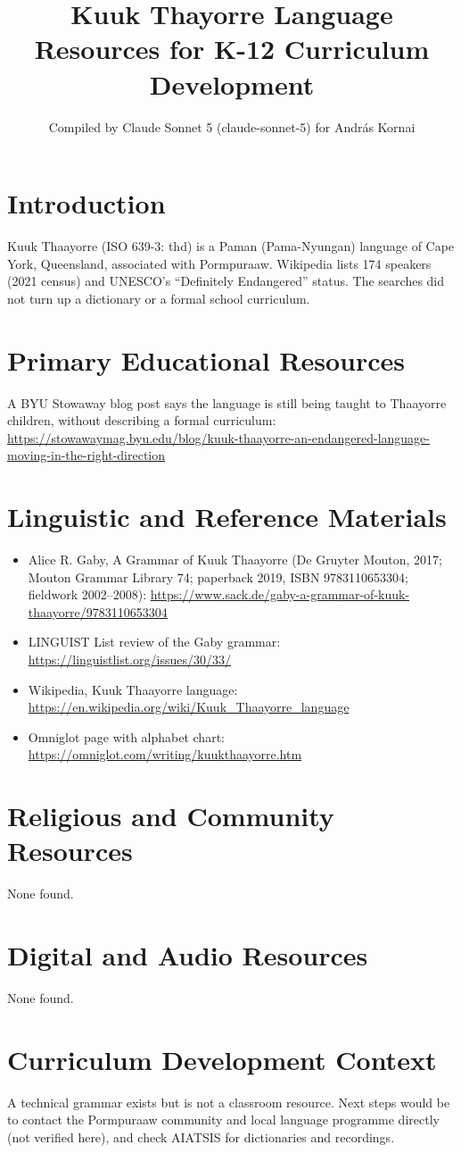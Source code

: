 \documentclass[12pt]{article}
\title{Kuuk Thayorre Language Resources for K-12 Curriculum Development}
\author{Compiled by Claude Sonnet 5 (claude-sonnet-5) for Andr\'as Kornai}
\date{}
\begin{document}
\maketitle
\section{Introduction}
Kuuk Thaayorre (ISO 639-3: thd) is a Paman (Pama-Nyungan) language of Cape York, Queensland, associated with Pormpuraaw. Wikipedia lists 174 speakers (2021 census) and UNESCO's ``Definitely Endangered'' status. The searches did not turn up a dictionary or a formal school curriculum.
\section{Primary Educational Resources}
A BYU Stowaway blog post says the language is still being taught to Thaayorre children, without describing a formal curriculum: \url{https://stowawaymag.byu.edu/blog/kuuk-thaayorre-an-endangered-language-moving-in-the-right-direction}
\section{Linguistic and Reference Materials}
\begin{itemize}
\item Alice R. Gaby, A Grammar of Kuuk Thaayorre (De Gruyter Mouton, 2017; Mouton Grammar Library 74; paperback 2019, ISBN 9783110653304; fieldwork 2002--2008): \url{https://www.sack.de/gaby-a-grammar-of-kuuk-thaayorre/9783110653304}
\item LINGUIST List review of the Gaby grammar: \url{https://linguistlist.org/issues/30/33/}
\item Wikipedia, Kuuk Thaayorre language: \url{https://en.wikipedia.org/wiki/Kuuk_Thaayorre_language}
\item Omniglot page with alphabet chart: \url{https://omniglot.com/writing/kuukthaayorre.htm}
\end{itemize}
\section{Religious and Community Resources}
None found.
\section{Digital and Audio Resources}
None found.
\section{Curriculum Development Context}
A technical grammar exists but is not a classroom resource. Next steps would be to contact the Pormpuraaw community and local language programme directly (not verified here), and check AIATSIS for dictionaries and recordings.
\end{document}
